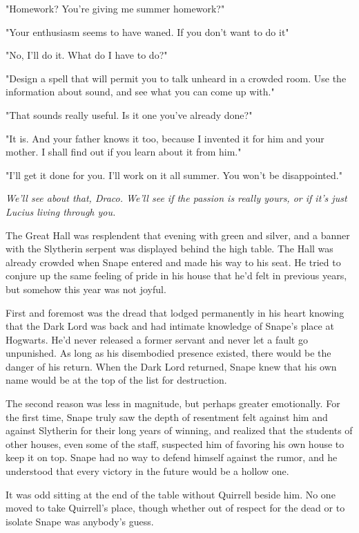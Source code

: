 "Homework? You're giving me summer homework?"

"Your enthusiasm seems to have waned. If you don't want to do it{\el}"

"No, I'll do it. What do I have to do?"

"Design a spell that will permit you to talk unheard in a crowded room. Use the information about sound, and see what you can come up with."

"That sounds really useful. Is it one you've already done?"

"It is. And your father knows it too, because I invented it for him and your mother. I shall find out if you learn about it from him."

"I'll get it done for you. I'll work on it all summer. You won't be disappointed."

\emph{We'll see about that, Draco. We'll see if the passion is really yours, or if it's just Lucius living through you.}

The Great Hall was resplendent that evening with green and silver, and a banner with the Slytherin serpent was displayed behind the high table. The Hall was already crowded when Snape entered and made his way to his seat. He tried to conjure up the same feeling of pride in his house that he'd felt in previous years, but somehow this year was not joyful.

First and foremost was the dread that lodged permanently in his heart knowing that the Dark Lord was back and had intimate knowledge of Snape's place at Hogwarts. He'd never released a former servant and never let a fault go unpunished. As long as his disembodied presence existed, there would be the danger of his return. When the Dark Lord returned, Snape knew that his own name would be at the top of the list for destruction.

The second reason was less in magnitude, but perhaps greater emotionally. For the first time, Snape truly saw the depth of resentment felt against him and against Slytherin for their long years of winning, and realized that the students of other houses, even some of the staff, suspected him of favoring his own house to keep it on top. Snape had no way to defend himself against the rumor, and he understood that every victory in the future would be a hollow one.

It was odd sitting at the end of the table without Quirrell beside him. No one moved to take Quirrell's place, though whether out of respect for the dead or to isolate Snape was anybody's guess.

